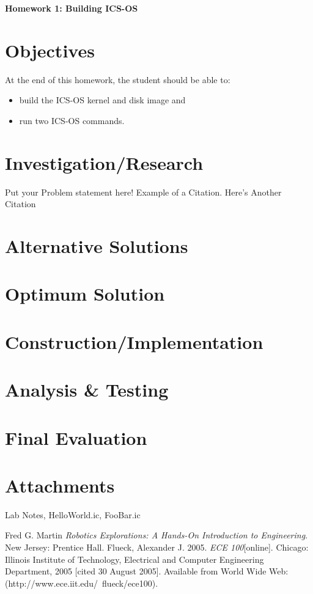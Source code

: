 \documentclass[a4paper, 11pt,oneside]{article}
\begin{document}
\begin{center}
	{\LARGE \textbf{Homework 1: Building ICS-OS}}
\end{center}


\section*{Objectives}
   At the end of this homework, the student should be able to:
   \begin{itemize}
       \item build the ICS-OS kernel and disk image and
       \item run two ICS-OS commands.
   \end{itemize}   

\section{Investigation/Research}
Put your Problem statement here! Example of a Citation\cite[p.219]{Robotics}. Here's Another Citation\cite{Flueck}

\section{Alternative Solutions}
\lipsum[3]

\section{Optimum Solution}
\lipsum[4]

\section{Construction/Implementation}
\lipsum[5]

\section{Analysis \& Testing}
\lipsum[6]

\section{Final Evaluation}
\lipsum[7]

\section{Attachments}
Lab Notes, HelloWorld.ic, FooBar.ic

\begin{thebibliography}{9}
 Fred G. Martin \emph{Robotics Explorations: A Hands-On Introduction to Engineering}. New Jersey: Prentice Hall.
  Flueck, Alexander J. 2005. \emph{ECE 100}[online]. Chicago: Illinois Institute of Technology, Electrical and Computer Engineering Department, 2005 [cited 30
August 2005]. Available from World Wide Web: (http://www.ece.iit.edu/~flueck/ece100).
\end{thebibliography}
\end{document}
